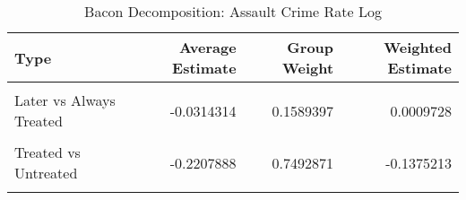 \begin{table}[H]

\caption{\label{tab:tab:bacondecompositionAssault}Bacon Decomposition: Assault Crime Rate Log}
\centering
\begin{tabular}[t]{lrrr}
\toprule
Type & Average Estimate & Group Weight & Weighted Estimate\\
\midrule
\cellcolor{gray!6}{Earlier vs Later Treated} & \cellcolor{gray!6}{0.1487745} & \cellcolor{gray!6}{0.0683810} & \cellcolor{gray!6}{0.0079628}\\
Later vs Always Treated & -0.0314314 & 0.1589397 & 0.0009728\\
\cellcolor{gray!6}{Later vs Earlier Treated} & \cellcolor{gray!6}{-0.0174274} & \cellcolor{gray!6}{0.0233921} & \cellcolor{gray!6}{-0.0034427}\\
Treated vs Untreated & -0.2207888 & 0.7492871 & -0.1375213\\
\cellcolor{gray!6}{Total TWFE} & \cellcolor{gray!6}{NaN} & \cellcolor{gray!6}{NaN} & \cellcolor{gray!6}{-0.1320284}\\
\bottomrule
\end{tabular}
\end{table}
